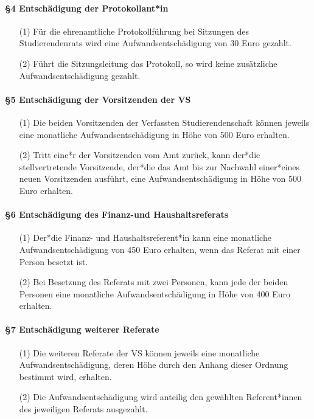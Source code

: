         \paragraph{§4 Entschädigung der Protokollant*in}
            \begin{itemize}
                \item[(1)] Für die ehrenamtliche Protokollführung bei Sitzungen des Studierendenrats wird eine Aufwandsentschädigung von 30 Euro gezahlt.
                \item[(2)] Führt die Sitzungsleitung das Protokoll, so wird keine zusätzliche Aufwandsentschädigung gezahlt.
            \end{itemize}
        \paragraph{§5 Entschädigung der Vorsitzenden der VS}
            \begin{itemize}
                \item[(1)] Die beiden Vorsitzenden der Verfassten Studierendenschaft können jeweils eine monatliche Aufwandsentschädigung in Höhe von 500 Euro erhalten.
                \item[(2)] Tritt eine*r der Vorsitzenden vom Amt zurück, kann der*die stellvertretende Vorsitzende, der*die das Amt bis zur Nachwahl einer*eines neuen Vorsitzenden ausführt, eine Aufwandsentschädigung in Höhe von 500 Euro erhalten. 
            \end{itemize}
        \paragraph{§6 Entschädigung des Finanz-und Haushaltsreferats}
            \begin{itemize}
                \item[(1)] Der*die Finanz- und Haushaltsreferent*in kann eine monatliche Aufwandsentschädigung von 450 Euro erhalten, wenn das Referat mit einer Person besetzt ist.
                \item[(2)] Bei Besetzung des Referats mit zwei Personen, kann jede der beiden Personen eine monatliche Aufwandsentschädigung in Höhe von 400 Euro erhalten. 
            \end{itemize}
        \paragraph{§7 Entschädigung weiterer Referate}
            \begin{itemize}
                \item[(1)]  Die weiteren Referate der VS können jeweils eine monatliche Aufwandsentschädigung, deren Höhe durch den Anhang dieser Ordnung bestimmt wird, erhalten. 
                \item[(2)]  Die Aufwandsentschädigung wird anteilig den gewählten Referent*innen des jeweiligen Referats ausgezahlt.
            \end{itemize}
